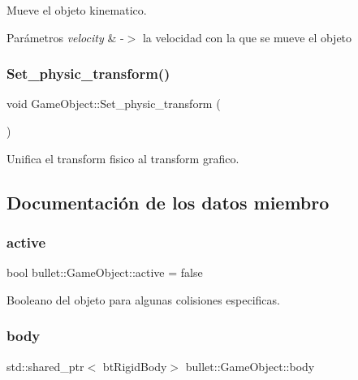 Mueve el objeto kinematico. 


\begin{DoxyParams}{Parámetros}
{\em velocity} & -\/$>$ la velocidad con la que se mueve el objeto \\
\hline
\end{DoxyParams}
\mbox{\label{classbullet_1_1_game_object_a3380fbf972b0b85f52fde35d3e738b72}} 
\subsubsection{\texorpdfstring{Set\_physic\_transform()}{Set\_physic\_transform()}}
{\footnotesize\ttfamily void Game\+Object\+::\+Set\+\_\+physic\+\_\+transform (\begin{DoxyParamCaption}{ }\end{DoxyParamCaption})}



Unifica el transform fisico al transform grafico. 



\subsection{Documentación de los datos miembro}
\mbox{\label{classbullet_1_1_game_object_a04aa167fbe80192ced647543c3e28e7d}} 
\subsubsection{\texorpdfstring{active}{active}}
{\footnotesize\ttfamily bool bullet\+::\+Game\+Object\+::active = false}



Booleano del objeto para algunas colisiones especificas. 

\mbox{\label{classbullet_1_1_game_object_a4e052c0aaac34a096654a14d04361b01}} 
\subsubsection{\texorpdfstring{body}{body}}
{\footnotesize\ttfamily std\+::shared\+\_\+ptr$<$ bt\+Rigid\+Body$>$ bullet\+::\+Game\+Object\+::body}



